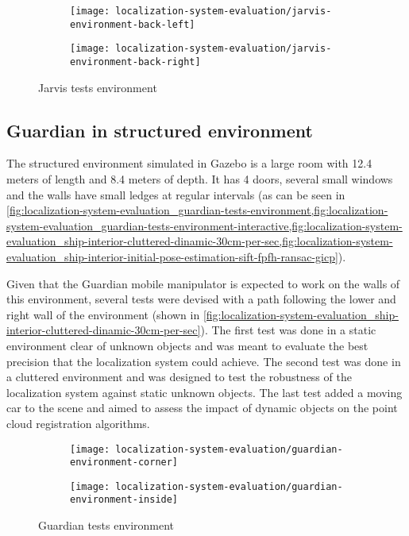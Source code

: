 \begin{figure}
	\centering
	\begin{subfigure}[h]{.497\textwidth}
		\centering
		\texttt{[image: localization-system-evaluation/jarvis-environment-back-left]}
	\end{subfigure}
	\begin{subfigure}[h]{.497\textwidth}
		\centering
		\texttt{[image: localization-system-evaluation/jarvis-environment-back-right]}
	\end{subfigure}
	\caption{Jarvis tests environment}
	\label{fig:localization-system-evaluation_jarvis-tests-environment}
\end{figure}


\subsection{Guardian in structured environment}

The structured environment simulated in Gazebo is a large room with 12.4 meters of length and 8.4 meters of depth. It has 4 doors, several small windows and the walls have small ledges at regular intervals (as can be seen in \cref{fig:localization-system-evaluation_guardian-tests-environment,fig:localization-system-evaluation_guardian-tests-environment-interactive,fig:localization-system-evaluation_ship-interior-cluttered-dinamic-30cm-per-sec,fig:localization-system-evaluation_ship-interior-initial-pose-estimation-sift-fpfh-ransac-gicp}).

Given that the Guardian mobile manipulator is expected to work on the walls of this environment, several tests were devised with a path following the lower and right wall of the environment (shown in \cref{fig:localization-system-evaluation_ship-interior-cluttered-dinamic-30cm-per-sec}). The first test was done in a static environment clear of unknown objects and was meant to evaluate the best precision that the localization system could achieve. The second test was done in a cluttered environment and was designed to test the robustness of the localization system against static unknown objects. The last test added a moving car to the scene and aimed to assess the impact of dynamic objects on the point cloud registration algorithms.


\begin{figure}[H]
	\centering
	\begin{subfigure}[h]{.497\textwidth}
		\centering
		\texttt{[image: localization-system-evaluation/guardian-environment-corner]}
	\end{subfigure}
	\begin{subfigure}[h]{.497\textwidth}
		\centering
		\texttt{[image: localization-system-evaluation/guardian-environment-inside]}
	\end{subfigure}
	\caption{Guardian tests environment}
	\label{fig:localization-system-evaluation_guardian-tests-environment}
\end{figure}


